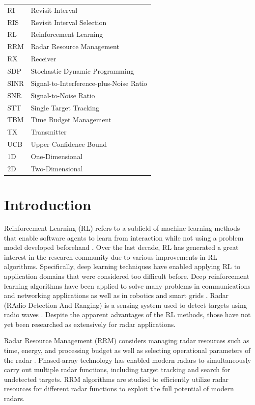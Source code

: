 \documentclass[english, 12pt, a4paper, elec, utf8, a-1b, online]{aaltothesis}
\begin{document}
\begin{tabular}{ll}
RI  & Revisit Interval \\
RIS & Revisit Interval Selection \\
RL & Reinforcement Learning \\
RRM & Radar Resource Management \\
RX & Receiver \\
SDP  & Stochastic Dynamic Programming \\
SINR  & Signal-to-Interference-plus-Noise Ratio \\
SNR & Signal-to-Noise Ratio \\
STT & Single Target Tracking \\
TBM & Time Budget Management \\
TX & Transmitter \\
UCB & Upper Confidence Bound \\
1D & One-Dimensional \\
2D & Two-Dimensional \\
\end{tabular}


\cleardoublepage
{}
\section{Introduction}
\setcounter{page}{1}

Reinforcement Learning (RL) refers to a subfield of machine learning methods that enable software agents to learn from interaction while not using a problem model developed beforehand \cite{Sutton2018}. 
Over the last decade, RL has generated a great interest in the research community due to various improvements in RL algorithms. 
Specifically, deep learning techniques have enabled applying RL to application domains that were considered too difficult before. 
Deep reinforcement learning algorithms have been applied to solve many problems in communications and networking applications \cite{Luong2018} as well as in robotics \cite{Kober2013} and smart grids \cite{Zhang2018}.
Radar (RAdio Detection And Ranging) is a sensing system used to detect targets using radio waves \cite{Curry2011}.
Despite the apparent advantages of the RL methods, those have not yet been researched as extensively for radar applications.


Radar Resource Management (RRM) considers managing radar resources such as time, energy, and processing budget as well as selecting operational parameters of the radar \cite{Moo2016}.
Phased-array technology has enabled modern radars to simultaneously carry out multiple radar functions, including target tracking and search for undetected targets.
RRM algorithms are studied to efficiently utilize radar resources for different radar functions to exploit the full potential of modern radars.
\end{document}
